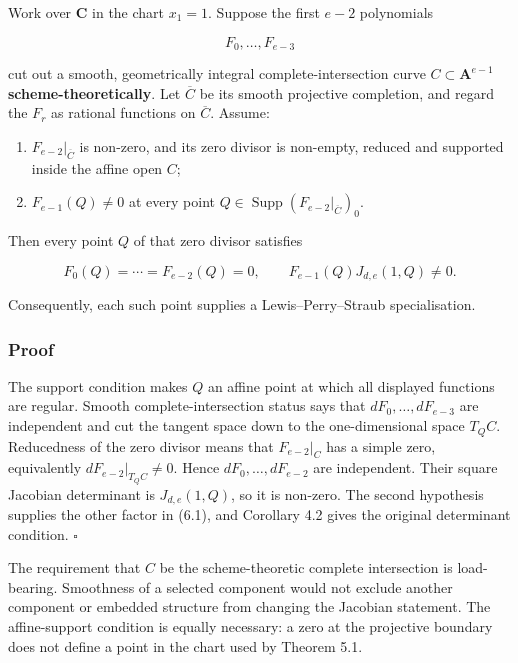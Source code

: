 \documentclass[
]{article}
\providecommand{\tightlist}{%
  \setlength{\itemsep}{0pt}\setlength{\parskip}{0pt}}
\begin{document}
Work over \(\mathbf C\) in the chart \(x_1=1\). Suppose the first
\(e-2\) polynomials

\[
F_0,\ldots,F_{e-3}
\]

cut out a smooth, geometrically integral complete-intersection curve
\(C\subset\mathbf A^{e-1}\) \textbf{scheme-theoretically}. Let
\(\overline C\) be its smooth projective completion, and regard the
\(F_r\) as rational functions on \(\overline C\). Assume:

\begin{enumerate}
\def\labelenumi{\arabic{enumi}.}
\tightlist
\item
  \(F_{e-2}|_{\overline C}\) is non-zero, and its zero divisor is
  non-empty, reduced and supported inside the affine open \(C\);
\item
  \(F_{e-1}(Q)\ne0\) at every point
  \(Q\in\operatorname{Supp}(F_{e-2}|_{\overline C})_0\).
\end{enumerate}

Then every point \(Q\) of that zero divisor satisfies

\[
F_0(Q)=\cdots=F_{e-2}(Q)=0,
\qquad
F_{e-1}(Q)J_{d,e}(1,Q)\ne0.
\tag{6.1}
\]

Consequently, each such point supplies a Lewis--Perry--Straub
specialisation.

\subsubsection*{Proof}\label{proof-6}

The support condition makes \(Q\) an affine point at which all displayed
functions are regular. Smooth complete-intersection status says that
\(dF_0,\ldots,dF_{e-3}\) are independent and cut the tangent space down
to the one-dimensional space \(T_QC\). Reducedness of the zero divisor
means that \(F_{e-2}|_C\) has a simple zero, equivalently
\(dF_{e-2}|_{T_QC}\ne0\). Hence \(dF_0,\ldots,dF_{e-2}\) are
independent. Their square Jacobian determinant is \(J_{d,e}(1,Q)\), so
it is non-zero. The second hypothesis supplies the other factor in
(6.1), and Corollary 4.2 gives the original determinant condition.
\(\square\)

The requirement that \(C\) be the scheme-theoretic complete intersection
is load-bearing. Smoothness of a selected component would not exclude
another component or embedded structure from changing the Jacobian
statement. The affine-support condition is equally necessary: a zero at
the projective boundary does not define a point in the chart used by
Theorem 5.1.
\end{document}
